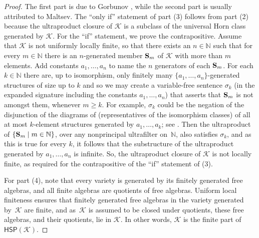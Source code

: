 \documentclass[reqno]{amsart}
\theoremstyle{plain}
\theoremstyle{definition}
\begin{document}
\begin{proof}
The first part is due to Gorbunov \cite[Proposition 2.5.12]{gor}, while the second part is usually attributed to Maltsev.  
The ``only if'' statement of part (3) follows from part (2) because the ultraproduct closure of $\mathscr{K}$ is a subclass of the universal Horn class generated by $\mathscr{K}$.
For the ``if'' statement, we prove the contrapositive.  
Assume that $\mathscr{K}$ is not uniformly locally finite, so that there exists an $n\in\mathbb{N}$ such that for every $m\in\mathbb{N}$ there is an $n$-generated member ${\bf S}_m$ of $\mathscr{K}$ with more than $m$ elements.
Add constants $a_1,\dots,a_n$ to name the $n$ generators of each ${\bf S}_m$.  
For each $k\in\mathbb{N}$ there are, up to isomorphism, only finitely many $\{a_1,\dots,a_n\}$-generated structures of size up to $k$ and so we may create a variable-free sentence $\sigma_k$ (in the expanded signature including the constants $a_1,\dots,a_n$) that asserts that ${\bf S}_m$ is not amongst them, whenever $m\geq k$.
For example, $\sigma_k$ could be the negation of the disjunction of the diagrams of (representatives of the isomorphism classes) of all at most $k$-element structures generated by $a_1,\dots,a_k$; see \cite[Definition~8.35]{ALV}.
Then the ultraproduct of $\{{\bf S}_m\mid m\in \mathbb{N}\}$, over any nonprincipal ultrafilter on~$\mathbb{N}$, also satisfies $\sigma_k$, and as this is true for every $k$, it follows that the substructure of the ultraproduct generated by $a_1,\dots,a_n$ is infinite.
So, the ultraproduct closure of $\mathscr{K}$ is not locally finite, as required for the contrapositive of the ``if'' statement of (3).

For part (4), note that every variety is generated by its finitely generated free algebras, and all finite algebras are quotients of free algebras.  Uniform local finiteness ensures that finitely generated free algebras in the variety generated by~$\mathscr{K}$ are finite, and as~$\mathscr{K}$ is assumed to be closed under quotients, these free algebras, and their quotients, lie in $\mathscr{K}$.  In other words, $\mathscr{K}$ is the finite part of $\mathsf{HSP}(\mathscr{K})$.
\end{proof}
\end{document}
